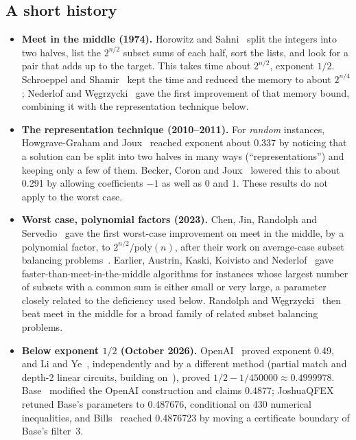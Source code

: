 \documentclass[11pt]{article}
\newcommand{\poly}{\mathrm{poly}}
\theoremstyle{plain}
\begin{document}
\subsection*{A short history}
\begin{itemize}
\item \textbf{Meet in the middle (1974).} Horowitz and Sahni~\cite{hs} split the integers into two halves, list the $2^{n/2}$ subset sums of each half, sort the lists, and look for a pair that adds up to the target. This takes time about $2^{n/2}$, exponent $1/2$. Schroeppel and Shamir~\cite{ss} kept the time and reduced the memory to about $2^{n/4}$; Nederlof and W\k{e}grzycki~\cite{nw} gave the first improvement of that memory bound, combining it with the representation technique below.
\item \textbf{The representation technique (2010--2011).} For \emph{random} instances, Howgrave-Graham and Joux~\cite{hgj} reached exponent about 0.337 by noticing that a solution can be split into two halves in many ways (``representations'') and keeping only a few of them. Becker, Coron and Joux~\cite{bcj} lowered this to about 0.291 by allowing coefficients $-1$ as well as $0$ and $1$. These results do not apply to the worst case.
\item \textbf{Worst case, polynomial factors (2023).} Chen, Jin, Randolph and Servedio~\cite{cjrs23} gave the first worst-case improvement on meet in the middle, by a polynomial factor, to $2^{n/2}/\poly(n)$, after their work on average-case subset balancing problems~\cite{cjrs22}. Earlier, Austrin, Kaski, Koivisto and Nederlof~\cite{akkn} gave faster-than-meet-in-the-middle algorithms for instances whose largest number of subsets with a common sum is either small or very large, a parameter closely related to the deficiency used below. Randolph and W\k{e}grzycki~\cite{rw} then beat meet in the middle for a broad family of related subset balancing problems.
\item \textbf{Below exponent $1/2$ (October 2026).} OpenAI~\cite{openai} proved exponent 0.49, and Li and Ye~\cite{yeli}, independently and by a different method (partial match and depth-2 linear circuits, building on~\cite{rw}), proved $1/2 - 1/450000 \approx 0.4999978$. Base~\cite{base} modified the OpenAI construction and claims 0.4877; JoshuaQFEX~\cite{joshua} retuned Base's parameters to 0.487676, conditional on 430 numerical inequalities, and Bills~\cite{bills} reached 0.4876723 by moving a certificate boundary of Base's filter~3.
\end{itemize}
\end{document}
